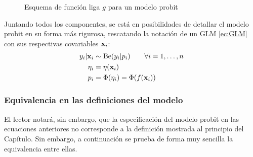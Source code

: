 \documentclass[../Main/Main.tex]{subfiles}
\begin{document}
\begin{figure}[h]
\centering
{}
\caption{Esquema de función liga $g$ para un modelo probit}
\label{fig:DiagramaFuncLiga}
\end{figure}

Juntando todos los componentes, se está en posibilidades de detallar el modelo probit en su forma más rigurosa, rescatando la notación de un GLM \eqref{ec:GLM} con sus respectivas covariables $\mathbf{x}_i$: 
\begin{align}
y_i|\mathbf{x}_i & \sim \text{Be}(y_i|p_i) \qquad \forall i = 1,\ldots,n\label{ec:ModProbitA}\\
\eta_i &= \eta(\mathbf{x}_i) \label{ec:ModProbitB} \\
p_i &= \Phi(\eta_i) = \Phi(f(\mathbf{x}_i)) \label{ec:ModProbitC}
\end{align}

\subsubsection*{Equivalencia en las definiciones del modelo}
El lector notará, sin embargo, que la especificación del modelo probit en las ecuaciones anteriores no corresponde a la definición mostrada al principio del Capítulo. Sin embargo, a continuación se prueba de forma muy sencilla la equivalencia entre ellas.\\
\end{document}
